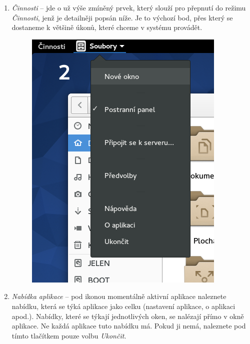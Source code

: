 \begin{enumerate}
\item\emph{Činnosti} -- jde o už výše zmíněný prvek, který slouží pro přepnutí do režimu \emph{Činnosti}, jenž je detailněji popsán níže. Je to výchozí bod, přes který se dostaneme k většině úkonů, které chceme v systému provádět.

\begin{figure}[t]
\begin{center}
\includegraphics[width=\textwidth]{img/menu-aplikace}
 \label{fig:menu-aplikace}
\end{center}
\end{figure}

\item\emph{Nabídka aplikace} -- pod ikonou momentálně aktivní aplikace naleznete nabídku, která se týká aplikace jako celku (nastavení aplikace, o aplikaci apod.). Nabídky, které se týkají jednotlivých oken, se nalézají přímo v okně aplikace. Ne každá aplikace tuto nabídku má. Pokud ji nemá, naleznete pod tímto tlačítkem pouze volbu \emph{Ukončit}.



\end{enumerate}
